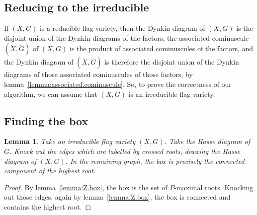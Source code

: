 \documentclass[a4paper,10pt]{amsart}
\newtheorem{lemma}{Lemma}
\theoremstyle{remark}
\newtheorem{example}{Example}
\begin{document}
\subsection{Reducing to the irreducible}
If \((X,G)\) is a reducible flag variety, then the Dynkin diagram of \((X,G)\) is the disjoint union of the Dynkin diagrams of the factors, the associated cominuscule \((\breve X,\breve G)\) of \((X,G)\) is the product of associated cominuscules of the factors,  and the Dynkin diagram of \((\breve X,\breve G)\) is therefore the disjoint union of the Dynkin diagrams of those associated cominuscules of those factors, by lemma~\vref{lemma:associated.cominuscule}.
So, to prove the correctness of our algorithm, we can assume that \((X,G)\) is an irreducible flag variety. 
\subsection{Finding the box}
\begin{lemma}
Take an irreducible flag variety \((X,G)\).
Take the Hasse diagram of \(G\).
Knock out the edges which are labelled by crossed roots, drawing the Hasse diagram of \((X,G)\).
In the remaining graph, the box is precisely the connected component of the highest root.
\end{lemma}
\begin{proof}
By lemma~\vref{lemma:Z.box}, the box is the set of \(P\)-maximal roots.
Knocking out those edges, again by lemma~\vref{lemma:Z.box}, the box is connected and contains the highest root.
\end{proof}
\end{document}
